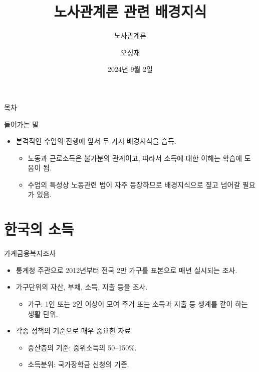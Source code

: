 \documentclass[aspectratio=169,xcolor=dvipsnames,handout]{beamer}
\title[들어가는 말]{노사관계론 관련 배경지식} %
\subtitle{노사관계론}
\author[오성재]{오성재}
\institute[CNU] %
{\relax
    충남대학교 경제학과\\
}
\date{2024년 9월 2일}
\begin{document}
\begin{frame}
    \titlepage\relax
\end{frame}

\begin{frame}{목차}
    \tableofcontents
\end{frame}

\begin{frame}{들어가는 말}
    \begin{itemize}
        \item 본격적인 수업의 진행에 앞서 두 가지 배경지식을 습득.
        \begin{itemize}
            \item 노동과 근로소득은 불가분의 관계이고, 따라서 소득에 대한 이해는 학습에 도움이 됨.
            \item 수업의 특성상 노동관련 법이 자주 등장하므로 배경지식으로 짚고 넘어갈 필요가 있음.
        \end{itemize}
    \end{itemize}
\end{frame}
\section{한국의 소득}

\begin{frame}{가계금융복지조사}
    \begin{itemize}
        \item 통계청 주관으로 2012년부터 전국 2만 가구를 표본으로 매년 실시되는 조사.
        \item 가구단위의 자산, 부채, 소득, 지출 등을 조사.
        \begin{itemize}
            \item 가구: 1인 또는 2인 이상이 모여 주거 또는 소득과 지출 등 생계를 같이 하는 생활 단위.
        \end{itemize}
        \item 각종 정책의 기준으로 매우 중요한 자료.
        \begin{itemize}
            \item 중산층의 기준: 중위소득의 50--150\%.
            \item 소득분위: 국가장학금 신청의 기준.
        \end{itemize}
    \end{itemize}
\end{frame}
\end{document}
